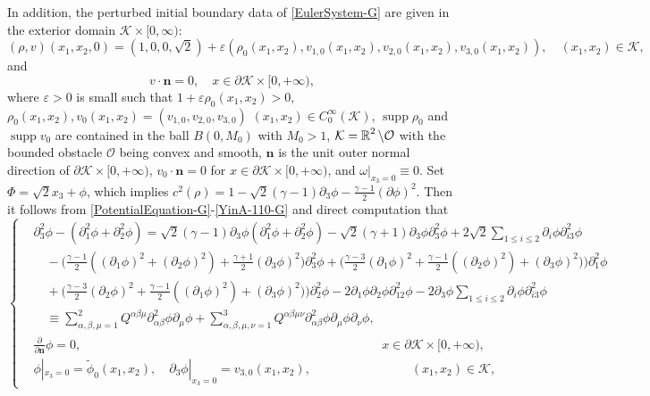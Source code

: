\documentclass[11pt,twoside]{article}
\def\cK{\mathcal K}
\def\cO{\mathcal O}
\def\R{\mathop{\mathbb R\kern 0pt}\nolimits}
\def\ds{\displaystyle}
\def\f{\frac}
\def\supp{\mathop{\rm supp}\nolimits}
\def\p{\partial}
\def\ve{\varepsilon}
\def\supp{\operatorname{supp}}
\def\bn{\mathbf{n}}
\theoremstyle{plain}
\theoremstyle{definition}
\numberwithin{equation}{section}
\begin{document}
In addition, the perturbed initial boundary data of \eqref{EulerSystem-G}
are given in the exterior domain $\cK\times [0,\infty)$:
\begin{equation}\label{initial-G}
(\rho, v)(x_1,x_2,0)=(1, 0, 0, \sqrt{2})+\ve (\rho_0(x_1,x_2), v_{1,0}(x_1,x_2), v_{2,0}(x_1,x_2),
v_{3,0}(x_1,x_2)),\quad (x_1,x_2)\in\cK,
\end{equation}
and
\begin{equation}\label{YinA-110-G}
v\cdot\bn=0, \quad x\in\p\cK\times [0,+\infty),
\end{equation}
where $\ve>0$ is small such that $1+\ve\rho_0(x_1,x_2)>0$,
$\rho_0(x_1,x_2), v_0(x_1,x_2)=(v_{1,0}, v_{2,0}, v_{3,0})$ $(x_1,x_2)\in C_0^{\infty}(\cK)$,
$\supp \rho_0$ and $\supp v_0$ are contained in the ball $B(0, M_0)$ with $M_0>1$,
$\cK=\R^2\setminus\cO$ with
the bounded obstacle $\cO$ being convex and smooth, $\bn$ is the unit outer normal direction of $\p\cK\times [0,+\infty)$,
$v_0\cdot\bn=0$ for $x\in\p\cK\times [0,+\infty)$, and $\omega|_{x_3=0}\equiv 0$. Set $\Phi=\sqrt{2}x_3+\phi$,
which implies $c^2(\rho)=1-\sqrt{2}(\gamma-1)\p_3\phi-\f{\gamma-1}{2}(\p\phi)^2$.
Then it follows from \eqref{PotentialEquation-G}-\eqref{YinA-110-G} and direct computation that
\begin{equation}\label{equationofphi-G}
\begin{cases}
&\p_3^2\phi-(\p_1^2\phi+\p_2^2\phi)=\sqrt{2}(\gamma-1)\p_3\phi(\p_1^2\phi+\p_2^2\phi)
-\sqrt{2}(\gamma+1)\p_3\phi\p_3^2\phi+2\sqrt{2}\ds\sum_{1 \leq i \leq 2}
\partial_i \phi\partial_{i3}^2 \phi\\
&\quad -\big(\f{\gamma-1}{2}((\p_1\phi)^2+(\p_2\phi)^2)+
\f{\gamma+1}{2}(\p_3\phi)^2\big)\p_3^2\phi+\big(\f{\gamma-3}{2}(\p_1\phi)^2+\f{\gamma-1}{2}((\p_2\phi)^2)+
(\p_3\phi)^2)\big)\p_1^2\phi\\
&\quad +\big(\f{\gamma-3}{2}(\p_2\phi)^2+\f{\gamma-1}{2}((\p_1\phi)^2)+
(\p_3\phi)^2)\big)\p_2^2\phi-2\partial_1\phi\partial_2\phi \partial_{12}^2 \phi-2\p_3\phi
\ds\sum_{1 \leq i \leq 2}
\partial_i\phi \partial_{i3}^2 \phi\\
&\quad \equiv\ds\sum_{\alpha,\beta,\mu=1}^2Q^{\alpha\beta\mu}\p^2_{\alpha\beta}\phi\p_{\mu}\phi
+\ds\sum_{\alpha,\beta,\mu,\nu=1}^3Q^{\alpha\beta\mu\nu}\p^2_{\alpha\beta}\phi\p_{\mu}\phi\p_{\nu}\phi,\\
&\f{\p}{\p\bn}\phi=0, \qquad \qquad \qquad \qquad \qquad \qquad \qquad \qquad \qquad \qquad \qquad \qquad x\in\p\cK\times[0,+\infty),\\
&\phi|_{x_3 = 0} =\tilde{\phi}_0(x_1,x_2), \quad
\partial_3 \phi|_{x_3 = 0} = v_{3,0}(x_1,x_2),\qquad \qquad \qquad \qquad (x_1,x_2)\in\cK,
\end{cases}
\end{equation}
\end{document}
